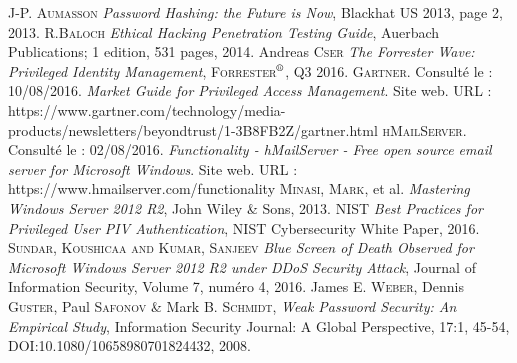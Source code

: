 \begin{thebibliography}{ABC}
	 J-P. \textsc{Aumasson} \emph{Password Hashing: the Future is Now}, Blackhat US 2013, page 2, 2013.
     R.\textsc{Baloch} \emph{Ethical Hacking Penetration Testing Guide}, Auerbach Publications; 1 edition, 531 pages, 2014.
     Andreas \textsc{Cser} \emph{The Forrester Wave\texttrademark: Privileged Identity Management}, \textsc{Forrester$^{\mbox{\scriptsize{\textregistered}}}$}, Q3 2016.
     \textsc{Gartner}. Consulté le : 10/08/2016. \emph{Market Guide for Privileged Access Management}. Site web. \textsc{URL} : https://www.gartner.com/technology/media-products/newsletters/beyondtrust/1-3B8FB2Z/gartner.html
     \textsc{hMailServer}. Consulté le : 02/08/2016. \emph{Functionality - hMailServer - Free open source email server for Microsoft Windows}. Site web. \textsc{URL} : https://www.hmailserver.com/functionality
     \textsc{Minasi}, \textsc{Mark}, et al. \emph{Mastering Windows Server 2012 R2}, John Wiley \& Sons, 2013.
     \textsc{NIST} \emph{Best Practices for Privileged User PIV Authentication}, NIST Cybersecurity White Paper, 2016.
     \textsc{Sundar, Koushicaa and Kumar, Sanjeev} \emph{Blue Screen of Death Observed for Microsoft Windows Server 2012 R2 under DDoS Security Attack}, Journal of Information Security, Volume 7, numéro 4, 2016.
     James E. \textsc{Weber}, Dennis \textsc{Guster}, Paul \textsc{Safonov} \& Mark B. \textsc{Schmidt}, \emph{Weak Password Security: An Empirical Study}, Information Security Journal: A Global Perspective, 17:1, 45-54, DOI:10.1080/10658980701824432, 2008.
\end{thebibliography}
